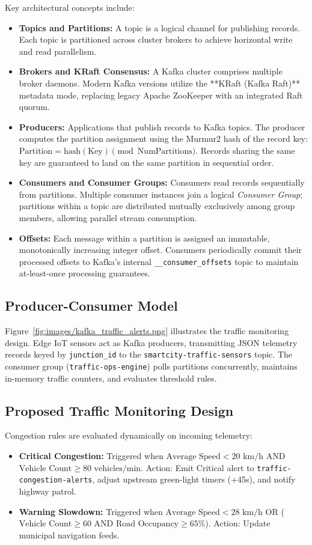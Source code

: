 \documentclass[12pt,a4paper]{report}
\begin{document}
Key architectural concepts include:
\begin{itemize}
    \item \textbf{Topics and Partitions:} A topic is a logical channel for publishing records. Each topic is partitioned across cluster brokers to achieve horizontal write and read parallelism.
    \item \textbf{Brokers and KRaft Consensus:} A Kafka cluster comprises multiple broker daemons. Modern Kafka versions utilize the **KRaft (Kafka Raft)** metadata mode, replacing legacy Apache ZooKeeper with an integrated Raft quorum.
    \item \textbf{Producers:} Applications that publish records to Kafka topics. The producer computes the partition assignment using the Murmur2 hash of the record key: $\text{Partition} = \text{hash}(\text{Key}) \pmod{\text{NumPartitions}}$. Records sharing the same key are guaranteed to land on the same partition in sequential order.
    \item \textbf{Consumers and Consumer Groups:} Consumers read records sequentially from partitions. Multiple consumer instances join a logical \textit{Consumer Group}; partitions within a topic are distributed mutually exclusively among group members, allowing parallel stream consumption.
    \item \textbf{Offsets:} Each message within a partition is assigned an immutable, monotonically increasing integer offset. Consumers periodically commit their processed offsets to Kafka's internal \texttt{\_\_consumer\_offsets} topic to maintain at-least-once processing guarantees.
\end{itemize}

\subsection{Producer-Consumer Model}
Figure~\ref{fig:images/kafka_traffic_alerts.png} illustrates the traffic monitoring design. Edge IoT sensors act as Kafka producers, transmitting JSON telemetry records keyed by \texttt{junction\_id} to the \texttt{smartcity-traffic-sensors} topic. The consumer group (\texttt{traffic-ops-engine}) polls partitions concurrently, maintains in-memory traffic counters, and evaluates threshold rules.

\subsection{Proposed Traffic Monitoring Design}
Congestion rules are evaluated dynamically on incoming telemetry:
\begin{itemize}
    \item \textbf{Critical Congestion:} Triggered when $\text{Average Speed} < 20\text{ km/h}$ AND $\text{Vehicle Count} \ge 80\text{ vehicles/min}$. Action: Emit Critical alert to \texttt{traffic-congestion-alerts}, adjust upstream green-light timers (+45s), and notify highway patrol.
    \item \textbf{Warning Slowdown:} Triggered when $\text{Average Speed} < 28\text{ km/h}$ OR ($\text{Vehicle Count} \ge 60$ AND $\text{Road Occupancy} \ge 65\%$). Action: Update municipal navigation feeds.
\end{itemize}
\end{document}
